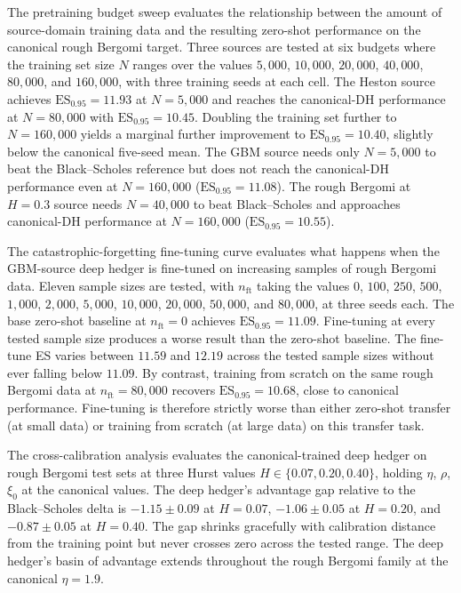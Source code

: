 \documentclass[12pt,a4paper]{article}
\theoremstyle{definition}
\theoremstyle{plain}
\theoremstyle{remark}
\theoremstyle{plain}
\begin{document}
The pretraining budget sweep evaluates the relationship between the
amount of source-domain training data and the resulting zero-shot
performance on the canonical rough Bergomi target. Three sources are
tested at six budgets where the training set size $N$ ranges over the
values $5{,}000$, $10{,}000$, $20{,}000$, $40{,}000$, $80{,}000$, and
$160{,}000$, with three training seeds at each cell. The
Heston source achieves $\mathrm{ES}_{0.95} = 11.93$ at $N = 5{,}000$
and reaches the canonical-DH performance at $N = 80{,}000$ with
$\mathrm{ES}_{0.95} = 10.45$. Doubling the training set further to
$N = 160{,}000$ yields a marginal further improvement to
$\mathrm{ES}_{0.95} = 10.40$, slightly below the canonical
five-seed mean. The GBM source needs only $N = 5{,}000$ to beat the
Black--Scholes reference but does not reach the canonical-DH
performance even at $N = 160{,}000$ ($\mathrm{ES}_{0.95} = 11.08$).
The rough Bergomi at $H = 0.3$ source needs $N = 40{,}000$ to beat
Black--Scholes and approaches canonical-DH performance at
$N = 160{,}000$ ($\mathrm{ES}_{0.95} = 10.55$).

The catastrophic-forgetting fine-tuning curve evaluates what happens
when the GBM-source deep hedger is fine-tuned on increasing samples
of rough Bergomi data. Eleven sample sizes are tested, with
$n_{\mathrm{ft}}$ taking the values
$0$, $100$, $250$, $500$, $1{,}000$, $2{,}000$, $5{,}000$,
$10{,}000$, $20{,}000$, $50{,}000$, and $80{,}000$, at three seeds
each. The base
zero-shot baseline at $n_{\mathrm{ft}} = 0$ achieves
$\mathrm{ES}_{0.95} = 11.09$. Fine-tuning at every tested sample size
produces a worse result than the zero-shot baseline. The fine-tune
ES varies between $11.59$ and $12.19$ across the tested sample sizes
without ever falling below $11.09$. By contrast, training from
scratch on the same rough Bergomi data at $n_{\mathrm{ft}} = 80{,}000$
recovers $\mathrm{ES}_{0.95} = 10.68$, close to canonical performance.
Fine-tuning is therefore strictly worse than either zero-shot
transfer (at small data) or training from scratch (at large data) on
this transfer task.

The cross-calibration analysis evaluates the canonical-trained deep
hedger on rough Bergomi test sets at three Hurst values
$H \in \{0.07, 0.20, 0.40\}$, holding $\eta$, $\rho$, $\xi_0$ at the
canonical values. The deep hedger's advantage gap relative to the
Black--Scholes delta is $-1.15 \pm 0.09$ at $H = 0.07$,
$-1.06 \pm 0.05$ at $H = 0.20$, and $-0.87 \pm 0.05$ at $H = 0.40$.
The gap shrinks gracefully with calibration distance from the
training point but never crosses zero across the tested range. The
deep hedger's basin of advantage extends throughout the rough Bergomi
family at the canonical $\eta = 1.9$.
\end{document}
